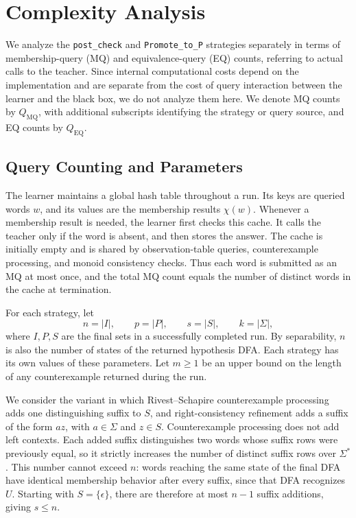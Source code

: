 \documentclass{ieice-tecrep}
\begin{document}
\section{Complexity Analysis}\label{complexity-analysis}

We analyze the \texttt{post\_check} and \texttt{Promote\_to\_P}
strategies separately in terms of membership-query (MQ) and
equivalence-query (EQ) counts, referring to actual calls to the teacher.
Since internal computational costs depend on the implementation and
are separate from the cost of query interaction between the learner
and the black box, we do not analyze them here.
We denote MQ counts by \(Q_{\mathrm{MQ}}\), with additional subscripts
identifying the strategy or query source, and EQ counts by
\(Q_{\mathrm{EQ}}\).

\subsection{Query Counting and Parameters}\label{complexity-query-counting}

The learner maintains a global hash table throughout a run. Its keys
are queried words \(w\), and its values are the membership results
\(\chi(w)\). Whenever a membership result is needed, the learner first
checks this cache. It calls the teacher only if the word is absent,
and then stores the answer. The cache is initially empty and is shared
by observation-table queries, counterexample processing, and monoid
consistency checks. Thus each word is submitted as an MQ at most once,
and the total MQ count equals the number of distinct words in the
cache at termination.

For each strategy, let
\[
n=|I|,\qquad p=|P|,\qquad s=|S|,\qquad k=|\Sigma|,
\]
where \(I,P,S\) are the final sets in a successfully completed run.
By separability, \(n\) is also the number of states of the returned
hypothesis DFA. Each strategy has its own values of these
parameters.
Let \(m\ge1\) be an upper bound on the length of any counterexample
returned during the run.

We consider the variant in which Rivest--Schapire counterexample
processing adds one distinguishing suffix to \(S\), and right-consistency
refinement adds a suffix of the form \(az\), with \(a\in\Sigma\) and
\(z\in S\). 
Counterexample processing does not add left contexts.
Each added suffix distinguishes two words whose suffix rows were
previously equal, so it strictly increases the number of distinct
suffix rows over \(\Sigma^*\). 
This number cannot exceed \(n\): words
reaching the same state of the final DFA have identical membership
behavior after every suffix, since that DFA recognizes \(U\).
Starting with \(S=\{\epsilon\}\), there are therefore at most
\(n-1\) suffix additions, giving
\(
s\le n.
\)
\end{document}
